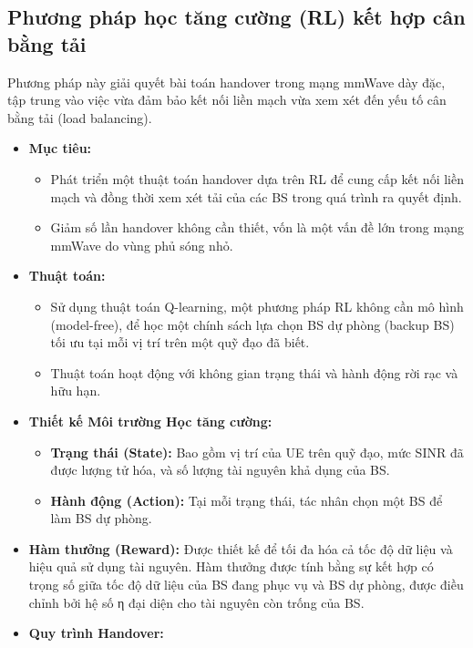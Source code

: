 \documentclass{article} %
\begin{document}
\subsection{Phương pháp học tăng cường (RL) kết hợp cân bằng tải} \cite{yang2021reinforcement}
Phương pháp này giải quyết bài toán handover trong mạng mmWave dày đặc, tập trung vào việc vừa đảm bảo kết nối liền mạch vừa xem xét đến yếu tố cân bằng tải (load balancing).
\begin{itemize}
    \item \textbf{Mục tiêu:}
    \begin{itemize}
        \item Phát triển một thuật toán handover dựa trên RL để cung cấp kết nối liền mạch và đồng thời xem xét tải của các BS trong quá trình ra quyết định.
        \item Giảm số lần handover không cần thiết, vốn là một vấn đề lớn trong mạng mmWave do vùng phủ sóng nhỏ.
    \end{itemize}
    \item \textbf{Thuật toán:}
    \begin{itemize}
        \item Sử dụng thuật toán Q-learning, một phương pháp RL không cần mô hình (model-free), để học một chính sách lựa chọn BS dự phòng (backup BS) tối ưu tại mỗi vị trí trên một quỹ đạo đã biết.
        \item Thuật toán hoạt động với không gian trạng thái và hành động rời rạc và hữu hạn.
    \end{itemize}
    \item \textbf{Thiết kế Môi trường Học tăng cường:}
    \begin{itemize}
        \item \textbf{Trạng thái (State):} Bao gồm vị trí của UE trên quỹ đạo, mức SINR đã được lượng tử hóa, và số lượng tài nguyên khả dụng của BS.
        \item \textbf{Hành động (Action):} Tại mỗi trạng thái, tác nhân chọn một BS để làm BS dự phòng.
    \end{itemize}
    \item \textbf{Hàm thưởng (Reward):} Được thiết kế để tối đa hóa cả tốc độ dữ liệu và hiệu quả sử dụng tài nguyên. Hàm thưởng được tính bằng sự kết hợp có trọng số giữa tốc độ dữ liệu của BS đang phục vụ và BS dự phòng, được điều chỉnh bởi hệ số η đại diện cho tài nguyên còn trống của BS.
    \item \textbf{Quy trình Handover:}
    \begin{itemize}

\end{itemize}
\end{itemize}
\end{document}

